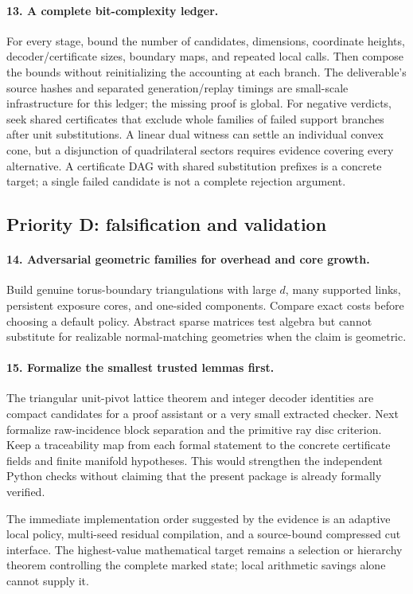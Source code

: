 \paragraph{13. A complete bit-complexity ledger.}
For every stage, bound the number of candidates, dimensions, coordinate
heights, decoder/certificate sizes, boundary maps, and repeated local calls.
Then compose the bounds without reinitializing the accounting at each branch.
The deliverable's source hashes and separated generation/replay timings are
small-scale infrastructure for this ledger; the missing proof is global.
For negative verdicts, seek shared certificates that exclude whole families
of failed support branches after unit substitutions.  A linear dual witness
can settle an individual convex cone, but a disjunction of quadrilateral
sectors requires evidence covering every alternative.  A certificate DAG
with shared substitution prefixes is a concrete target; a single failed
candidate is not a complete rejection argument.

\subsection{Priority D: falsification and validation}

\paragraph{14. Adversarial geometric families for overhead and core growth.}
Build genuine torus-boundary triangulations with large $d$, many supported
links, persistent exposure cores, and one-sided components.  Compare exact
costs before choosing a default policy.  Abstract sparse matrices test algebra
but cannot substitute for realizable normal-matching geometries when the
claim is geometric.

\paragraph{15. Formalize the smallest trusted lemmas first.}
The triangular unit-pivot lattice theorem and integer decoder identities are
compact candidates for a proof assistant or a very small extracted checker.
Next formalize raw-incidence block separation and the primitive ray disc
criterion.  Keep a traceability map from each formal statement to the concrete
certificate fields and finite manifold hypotheses.  This would strengthen
the independent Python checks without claiming that the present package is
already formally verified.

The immediate implementation order suggested by the evidence is an adaptive
local policy, multi-seed residual compilation, and a source-bound compressed
cut interface.  The highest-value mathematical target remains a selection
or hierarchy theorem controlling the complete marked state; local arithmetic
savings alone cannot supply it.
